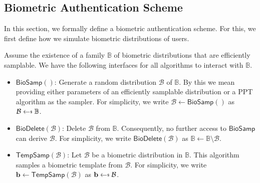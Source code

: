 



\subsection{Biometric Authentication Scheme}

In this section, we formally define a biometric authentication scheme. For this, we first define how we simulate biometric distributions of users.

Assume the existence of a family $\mathbb{B}$ of biometric distributions that are efficiently samplable. We have the following interfaces for all algorithms to interact with $\mathbb{B}$.

\begin{itemize}

	\item $\textsf{BioSamp}()$: Generate a random distribution $\mathcal{B}$ of $\mathbb{B}$. By this we mean providing either parameters of an efficiently samplable distribution or a PPT algorithm as the sampler. For simplicity, we write $\mathcal{B} \gets \textsf{BioSamp}()$ as $\mathcal{B} \getsdollar \mathbb{B}$.
	
	\item $\textsf{BioDelete}(\mathcal{B})$: Delete $\mathcal{B}$ from $\mathbb{B}$. Consequently, no further access to $\textsf{BioSamp}$ can derive $\mathcal{B}$. For simplicity, we write $\textsf{BioDelete}(\mathcal{B})$ as $\mathbb{B} \gets \mathbb{B} \setminus \mathcal{B}$.

	\item $\textsf{TempSamp}(\mathcal{B})$: Let $\mathcal{B}$ be a biometric distribution in $\mathbb{B}$. This algorithm samples a biometric template from $\mathcal{B}$. For simplicity, we write $\mathbf{b} \gets \textsf{TempSamp}(\mathcal{B})$ as $\mathbf{b} \getsdollar \mathcal{B}$.

\end{itemize}

